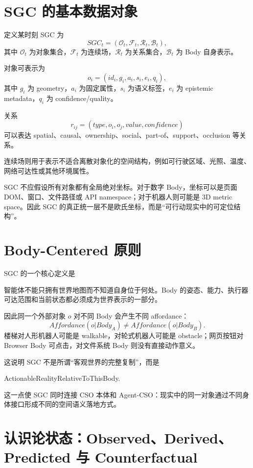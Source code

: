 \section{SGC 的基本数据对象}

定义某时刻 SGC 为
\[
SGC_t
=
(\mathcal O_t,\mathcal F_t,\mathcal R_t,\mathcal B_t),
\]
其中 $\mathcal O_t$ 为对象集合，$\mathcal F_t$ 为连续场，$\mathcal R_t$ 为关系集合，$\mathcal B_t$ 为 Body 自身表示。

对象可表示为
\[
o_i=
(
id_i,
g_i,
a_i,
s_i,
e_i,
q_i
),
\]
其中 $g_i$ 为 geometry，$a_i$ 为固定属性，$s_i$ 为语义标签，$e_i$ 为 epistemic metadata，$q_i$ 为 confidence/quality。

关系
\[
r_{ij}
=
(type,o_i,o_j,value,confidence)
\]
可以表达 spatial、causal、ownership、social、part-of、support、occlusion 等关系。

连续场则用于表示不适合离散对象化的空间结构，例如可行驶区域、光照、温度、网络可达性或其他环境属性。

SGC 不应假设所有对象都有全局绝对坐标。对于数字 Body，坐标可以是页面 DOM、窗口、文件路径或 API namespace；对于机器人则可能是 3D metric space。因此 SGC 的真正统一层不是欧氏坐标，而是“可行动现实中的可定位结构”。

\section{Body-Centered 原则}

SGC 的一个核心定义是
\begin{statementbox}
\centering
{}
\end{statementbox}
智能体不能只拥有世界地图而不知道自身位于何处。Body 的姿态、能力、执行器可达范围和当前状态都必须成为世界表示的一部分。

因此同一个外部对象 $o$ 对不同 Body 会产生不同 affordance：
\[
Affordance(o|Body_A)
\neq
Affordance(o|Body_B).
\]
楼梯对人形机器人可能是 walkable，对轮式机器人可能是 obstacle；网页按钮对 Browser Body 可点击，对文件系统 Body 则没有直接动作意义。

这说明 SGC 不是所谓“客观世界的完整复制”，而是
\begin{statementbox}
ActionableRealityRelativeToThisBody.
\end{statementbox}
这一点使 SGC 同时连接 CSO 本体和 Agent-CSO：现实中的同一对象通过不同身体接口形成不同的空间语义落地方式。

\section{认识论状态：Observed、Derived、Predicted 与 Counterfactual}

